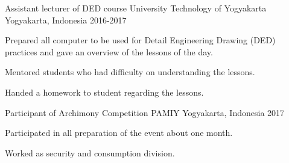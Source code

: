 \begin{cventries}
  \cventry
    {Assistant lecturer of DED course} %
    {University Technology of Yogyakarta} %
    {Yogyakarta, Indonesia} %
    {2016-2017} %
    {
      \begin{cvitems} %
        \item {Prepared all computer to be used for Detail Engineering Drawing (DED) practices and gave an overview of the lessons of the day.}
        \item{Mentored students who had difficulty on understanding the lessons.}
        \item{Handed a homework to student regarding the lessons.}
      \end{cvitems}
    }

  \cventry
    {Participant of Archimony Competition} %
    {PAMIY} %
    {Yogyakarta, Indonesia} %
    {2017} %
    {
      \begin{cvitems} %
      \item{Participated in all preparation of the event about one month.}
        \item {Worked as security and consumption division.}
      \end{cvitems}
    }

\end{cventries}
